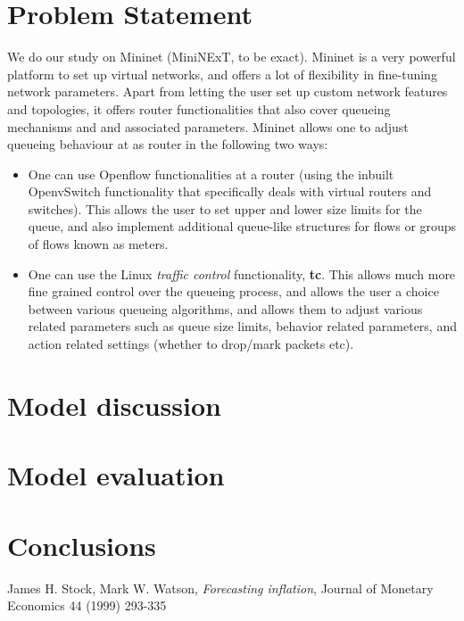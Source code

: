 \documentclass[paper=letter, fontsize=13pt]{article}
\begin{document}
\section{Problem Statement}
We do our study on Mininet (MiniNExT, to be exact). Mininet is a very powerful platform to set up virtual networks, and offers a lot of flexibility in fine-tuning network parameters. Apart from letting the user set up custom network features and topologies, it offers router functionalities that also cover queueing mechanisms and and associated parameters. Mininet allows one to adjust queueing behaviour at as router in the following two ways:
\begin{itemize}
  \item One can use Openflow functionalities at a router (using the inbuilt OpenvSwitch functionality that specifically deals with virtual routers and switches). This allows the user to set upper and lower size limits for the queue, and also implement additional queue-like structures for flows or groups of flows known as meters.
  \item One can use the Linux \textit{traffic control} functionality, \textbf{tc}. This allows much more fine grained control over the queueing process, and allows the user a choice between various queueing algorithms, and allows them to adjust various related parameters such as queue size limits, behavior related parameters, and action related settings (whether to drop/mark packets etc).
\end{itemize}



\section{Model discussion}


\section{Model evaluation}



\section{Conclusions}




\begin{thebibliography}{99}
James H. Stock, Mark  W. Watson, \textit{Forecasting inflation}, Journal of Monetary Economics 44 (1999) 293-335

\end{thebibliography}


\end{document}
